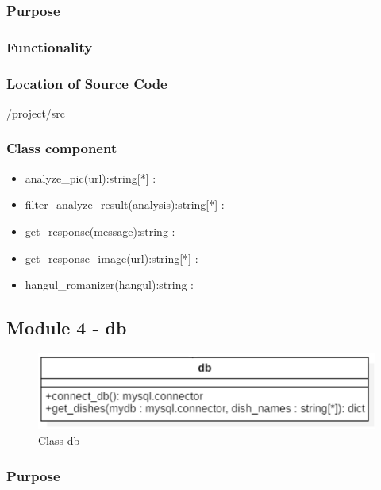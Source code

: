 \subsubsection {Purpose}

\subsubsection {Functionality}


\subsubsection {Location of Source Code}
/project/src

\subsubsection {Class component}


\begin{itemize}
\item analyze\_pic(url):string[*] :
\item filter\_analyze\_result(analysis):string[*] :
\item get\_response(message):string :
\item get\_response\_image(url):string[*] :
\item hangul\_romanizer(hangul):string : 
\end{itemize} 

\FloatBarrier

\subsection{Module 4 - db}

\begin{figure}[htbp]
\centerline{\includegraphics[width=\linewidth]{./pictures/class_db}}
\caption{Class db}
\label{fig:class_db}
\end{figure}
\FloatBarrier

\subsubsection {Purpose}

